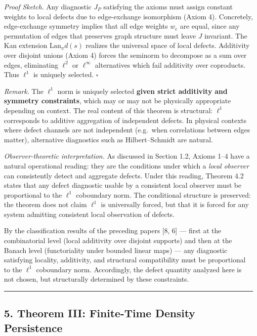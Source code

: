 \documentclass[
]{article}
\begin{document}
\emph{Proof Sketch.} Any diagnostic \(J_P\) satisfying the axioms must
assign constant weights to local defects due to edge-exchange
isomorphism (Axiom 4). Concretely, edge-exchange symmetry implies that
all edge weights \(w_e\) are equal, since any permutation of edges that
preserves graph structure must leave \(J\) invariant. The Kan extension
\(\mathrm{Lan}_\pi d(s)\) realizes the universal space of local defects.
Additivity over disjoint unions (Axiom 4) forces the seminorm to
decompose as a sum over edges, eliminating \(\ell^2\) or \(\ell^\infty\)
alternatives which fail additivity over coproducts. Thus \(\ell^1\) is
uniquely selected. \(\square\)

\emph{Remark.} The \(\ell^1\) norm is uniquely selected \textbf{given
strict additivity and symmetry constraints}, which may or may not be
physically appropriate depending on context. The real content of this
theorem is structural: \(\ell^1\) corresponds to additive aggregation of
independent defects. In physical contexts where defect channels are not
independent (e.g.~when correlations between edges matter), alternative
diagnostics such as Hilbert--Schmidt are natural.

\emph{Observer-theoretic interpretation.} As discussed in Section 1.2,
Axioms 1--4 have a natural operational reading: they are the conditions
under which a \emph{local observer} can consistently detect and
aggregate defects. Under this reading, Theorem 4.2 states that any
defect diagnostic usable by a consistent local observer must be
proportional to the \(\ell^1\) coboundary norm. The conditional
structure is preserved: the theorem does not claim \(\ell^1\) is
universally forced, but that it is forced for any system admitting
consistent local observation of defects.

By the classification results of the preceding papers {[}8, 6{]} ---
first at the combinatorial level (local additivity over disjoint
supports) and then at the Banach level (functoriality under bounded
linear maps) --- any diagnostic satisfying locality, additivity, and
structural compatibility must be proportional to the \(\ell^1\)
coboundary norm. Accordingly, the defect quantity analyzed here is not
chosen, but structurally determined by these constraints.

\begin{center}\rule{0.5\linewidth}{0.5pt}\end{center}

\subsection{5. Theorem III: Finite-Time Density
Persistence}\label{theorem-iii-finite-time-density-persistence}
\end{document}
